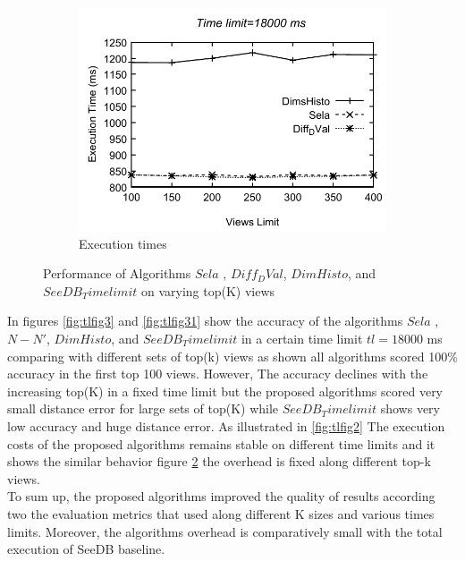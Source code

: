 \begin{figure}
\begin{subfigure}[b]{0.32\textwidth}
    \includegraphics[width=\textwidth]{tl4.pdf}
     \caption{Execution times}
       \label{fig:tlfig4}%
  \end{subfigure}
  \caption{ Performance of Algorithms $Sela$ , $Diff_DVal$, $DimHisto$, and $SeeDB_Timelimit$ on varying top(K) views}
\end{figure}

In figures \ref{fig:tlfig3} and \ref{fig:tlfig31} show the accuracy of the 
algorithms $Sela$ , $N-N'$, $DimHisto$, and $SeeDB_Timelimit$ in a certain time limit $tl=18000$ ms
 comparing with different sets of top(k) views as shown all algorithms scored 100\% accuracy in the first top 100 views. 
However, The accuracy declines with the increasing top(K) in a fixed time limit but the 
proposed algorithms scored very small distance error for large sets of top(K) while $SeeDB_Timelimit$ shows very low accuracy and huge distance error. 
As illustrated in \ref{fig:tlfig2} The execution costs of the proposed algorithms remains stable on different time limits and it shows
the similar behavior figure \ref{fig:tlfig4} the overhead is fixed along different top-k views.\\
  
To sum up, the proposed algorithms improved the quality of results according two the evaluation metrics that used along different
K sizes and various times limits. Moreover, the algorithms overhead is comparatively small with the total execution of SeeDB baseline.	
